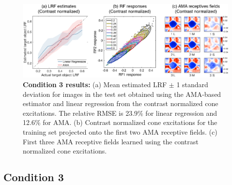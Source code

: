 \documentclass{jov}
\begin{document}
\begin{figure}
\centering
\includegraphics[width=1.0\textwidth]{Figure12.eps}
    \caption{{\bf Condition 3 results:} (a) Mean estimated LRF $\pm$ 1 standard deviation for images in the test set obtained using the AMA-based estimator and linear regression from the contrast normalized cone excitations. The relative RMSE is 23.9\%  for linear regression and 12.6\% for AMA. (b) Contrast normalized cone excitations for the training set projected onto the first two AMA receptive fields. (c) First three AMA receptive fields learned using the contrast normalized cone excitations.}
\label{fig:Condition3}
\end{figure}

\subsection{Condition 3}
\end{document}
